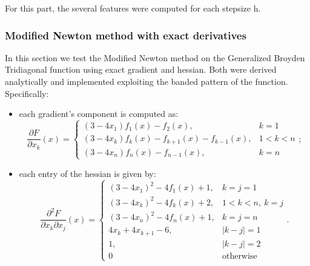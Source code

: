 \documentclass[a4paper,12pt]{article}
\begin{document}
	\noindent For this part, the several features were computed for each stepsize h.
	
	\subsubsection{Modified Newton method with exact derivatives}
	
	In this section we test the Modified Newton method on the Generalized Broyden Tridiagonal function using exact gradient and hessian. Both were derived analytically and implemented exploiting the banded pattern of the function. Specifically:
	
	\begin{itemize}
		\item each gradient's component is computed as:
		\[
		\frac{\partial F}{\partial x_k}(x) =
		\begin{cases}
			(3 - 4x_1)f_1(x) - f_2(x), & k = 1 \\
			(3 - 4x_k)f_k(x) - f_{k+1}(x) - f_{k-1}(x), & 1 < k < n \\
			(3 - 4x_n)f_n(x) - f_{n-1}(x), & k = n
		\end{cases};
		\]	
		\item each entry of the hessian is given by:
		\[
		\frac{\partial^2 F}{\partial x_k \partial x_j}(x) =
		\begin{cases}
			(3 - 4x_1)^2 - 4f_1(x) + 1, & k = j = 1 \\
			(3 - 4x_k)^2 - 4f_k(x) + 2, & 1 < k < n,\ k = j \\
			(3 - 4x_n)^2 - 4f_n(x) + 1, & k = j = n \\
			4x_k + 4x_{k+1} - 6, & |k - j| = 1 \\
			1, & |k - j| = 2 \\
			0 & \text{otherwise}
		\end{cases}.
		\]
	\end{itemize}	
		
	
	
	
\end{document}
